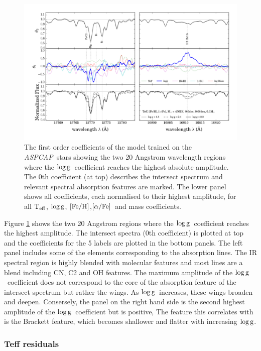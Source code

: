 \documentclass[12pt, preprint]{aastex}
\newcommand{\project}[1]{\textsl{#1}}
\newcommand{\aspcap}{\project{ASPCAP}}
\newcommand{\teff}{\mbox{$\rm T_{eff}$}}
\newcommand{\feh}{\mbox{$\rm [Fe/H]$}}
\newcommand{\alphafe}{\mbox{$\rm [\alpha/Fe]$}}
\newcommand{\logg}{\mbox{$\rm \log g$}}
\begin{document}
\begin{figure}[p!]
\centering
    \includegraphics[scale=0.51]{./plots/coeffs_g_3.png}
  \caption{The first order coefficients of the model trained on the \aspcap\ stars showing the two 20 Angstrom wavelength regions where the \logg\ coefficient reaches the highest absolute amplitude. The 0th coefficient (at top) describes the intersect spectrum and relevant spectral absorption features are marked. The lower panel shows all coefficients, each normalised to their highest amplitude, for all \teff, \logg, \feh,\alphafe\ and mass coefficients.}
\label{fig:g}
\end{figure}

Figure \ref{fig:g} shows the two 20 Angstrom regions where the \logg\ coefficient reaches the highest amplitude. The intersect spectra (0th coefficient) is plotted at top and the coefficients for the 5 labels are plotted in the bottom panels.  The left panel includes some of the elements corresponding to the absorption lines. The IR spectral region is highly blended with molecular features and most lines are a blend including CN, C2 and OH features. The maximum amplitude of the \logg\ coefficient does not correspond to the core of the absorption feature of the intersect spectrum but rather the wings. As \logg\ increases, these wings broaden and deepen. Consersely, the panel on the right hand side is the second highest amplitude of the \logg\ coefficient but is positive, The feature this correlates with is the Brackett feature, which becomes shallower and flatter with increasing \logg. 




\subsubsection{Teff residuals}
\end{document}
